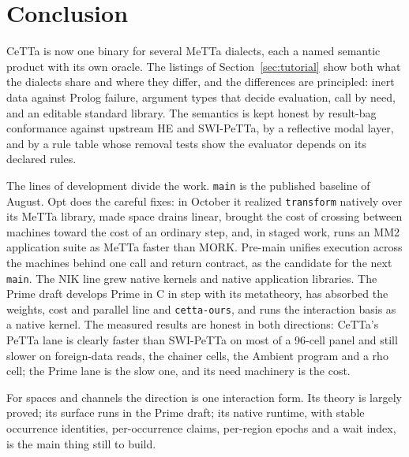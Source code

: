 \documentclass[11pt]{article}
\newcommand{\code}[1]{\texttt{#1}}
\newcommand{\PeTTa}{\textup{PeTTa}}
\newcommand{\HE}{\textup{HE}}
\newcommand{\CeTTa}{\textup{CeTTa}}
\begin{document}
\section{Conclusion}
\label{sec:conclusion}

\CeTTa{} is now one binary for several MeTTa dialects, each a named semantic
product with its own oracle.  The listings of Section~\ref{sec:tutorial} show
both what the dialects share and where they differ, and the differences are
principled: inert data against Prolog failure, argument types that decide
evaluation, call by need, and an editable standard library.  The semantics is
kept honest by result-bag conformance against upstream \HE{} and
SWI-\PeTTa{}, by a reflective modal layer, and by a rule table whose removal
tests show the evaluator depends on its declared rules.

The lines of development divide the work.  \code{main} is the published
baseline of August.  Opt does the careful fixes: in October it realized
\code{transform} natively over its MeTTa library, made space drains linear,
brought the cost of crossing between machines toward the cost of an ordinary
step, and, in staged work, runs an MM2 application suite as MeTTa faster than
MORK.  Pre-main unifies execution across the machines behind one call and
return contract, as the candidate for the next \code{main}.  The NIK line
grew native kernels and native application libraries.  The Prime draft
develops Prime in C in step with its metatheory, has absorbed the weights,
cost and parallel line and \code{cetta-ours}, and runs the interaction basis
as a native kernel.  The measured results are honest in both directions:
\CeTTa{}'s \PeTTa{} lane is clearly faster than SWI-\PeTTa{} on most of a
96-cell panel and still slower on foreign-data reads, the chainer cells, the
Ambient program and a rho cell; the Prime lane is the slow one, and its need
machinery is the cost.

For spaces and channels the direction is one interaction form.  Its theory is
largely proved; its surface runs in the Prime draft; its native runtime, with
stable occurrence identities, per-occurrence claims, per-region epochs and a
wait index, is the main thing still to build.
\end{document}

